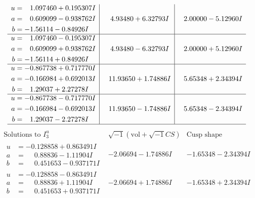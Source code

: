 \documentclass[1p]{elsarticle_modified}
\theoremstyle{definition}
\newcommand{\I}{\sqrt{-1}}
\begin{document}
$$\begin{array}{c|c|c}
\begin{aligned}
u &= \phantom{-}1.097460 + 0.195307 I \\
a &= \phantom{-}0.609099 - 0.938762 I \\
b &= -1.56114 - 0.84926 I\end{aligned}
 & \phantom{-}4.93480 + 6.32793 I & \phantom{-}2.00000 - 5.12960 I \\ \hline\begin{aligned}
u &= \phantom{-}1.097460 - 0.195307 I \\
a &= \phantom{-}0.609099 + 0.938762 I \\
b &= -1.56114 + 0.84926 I\end{aligned}
 & \phantom{-}4.93480 - 6.32793 I & \phantom{-}2.00000 + 5.12960 I \\ \hline\begin{aligned}
u &= -0.867738 + 0.717770 I \\
a &= -0.166984 + 0.692013 I \\
b &= \phantom{-}1.29037 + 2.27278 I\end{aligned}
 & \phantom{-}11.93650 + 1.74886 I & \phantom{-}5.65348 + 2.34394 I \\ \hline\begin{aligned}
u &= -0.867738 - 0.717770 I \\
a &= -0.166984 - 0.692013 I \\
b &= \phantom{-}1.29037 - 2.27278 I\end{aligned}
 & \phantom{-}11.93650 - 1.74886 I & \phantom{-}5.65348 - 2.34394 I\\
 \hline 
 \end{array}$$\newpage$$\begin{array}{c|c|c}  
\text{Solutions to }I^u_{3}& \I (\text{vol} + \sqrt{-1}CS) & \text{Cusp shape}\\
 \hline 
\begin{aligned}
u &= -0.128858 + 0.863491 I \\
a &= \phantom{-}0.88836 - 1.11904 I \\
b &= \phantom{-}0.451653 - 0.937171 I\end{aligned}
 & -2.06694 - 1.74886 I & -1.65348 - 2.34394 I \\ \hline\begin{aligned}
u &= -0.128858 - 0.863491 I \\
a &= \phantom{-}0.88836 + 1.11904 I \\
b &= \phantom{-}0.451653 + 0.937171 I\end{aligned}
 & -2.06694 + 1.74886 I & -1.65348 + 2.34394 I \\ \hline\begin{aligned}

\end{aligned}
\end{array}$$
\end{document}
